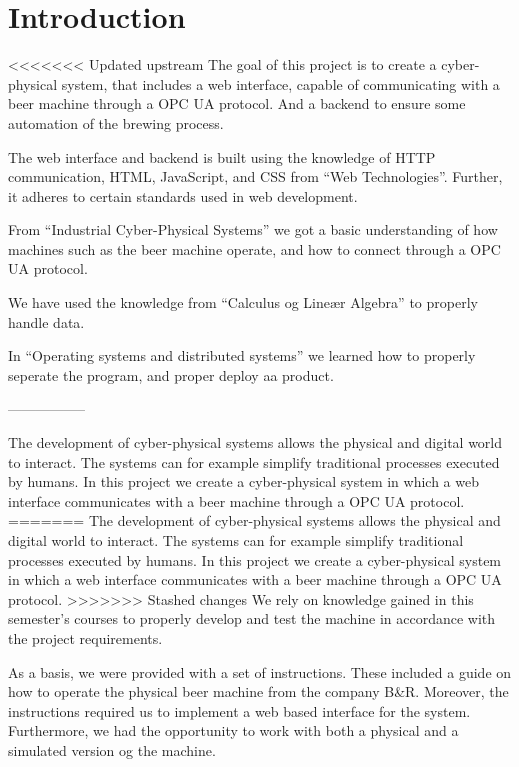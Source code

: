 \section{Introduction}

<<<<<<< Updated upstream
The goal of this project is to create a cyber-physical system, that includes a web interface, capable of communicating with a beer machine
through a OPC UA protocol. And a backend to ensure some automation of the brewing process.\newline

The web interface and backend is built using the knowledge of HTTP communication, HTML, JavaScript, and CSS from “Web Technologies”.
Further, it adheres to certain standards used in web development.

From “Industrial Cyber-Physical Systems” we got a basic understanding of how machines such as the beer machine operate,
and how to connect through a OPC UA protocol.

We have used the knowledge from “Calculus og Lineær Algebra” to properly handle data.

In “Operating systems and distributed systems” we learned how to properly seperate the program, and proper deploy aa product.

-----------------

The development of cyber-physical systems allows the physical and digital world to interact.
The systems can for example simplify traditional processes executed by humans.
In this project we create a cyber-physical system in which a web interface communicates with a beer machine through a OPC UA protocol.
=======
The development of cyber-physical systems allows the physical and digital world to interact. 
The systems can for example simplify traditional processes executed by humans. 
In this project we create a cyber-physical system in which a web interface communicates with a beer machine through a OPC UA protocol. 
>>>>>>> Stashed changes
We rely on knowledge gained in this semester's courses to properly develop and test the machine in accordance with the project requirements.

As a basis, we were provided with a set of instructions. These included a guide on how to operate the physical beer machine from the company B\&R. 
Moreover, the instructions required us to implement a web based interface for the system. 
Furthermore, we had the opportunity to work with both a physical and a simulated version og the machine.